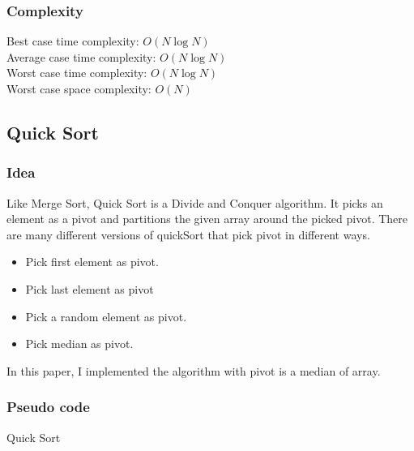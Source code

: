 \documentclass[11pt,a4paper]{article}
\begin{document}
\subsubsection*{Complexity}
Best case time complexity: $O(N \log N)$ \\
Average case time complexity: $O(N\log N)$\\
Worst case time complexity: $O(N \log N)$ \\
Worst case space complexity: $O(N)$

\subsection{Quick Sort}
\subsubsection*{Idea}
Like Merge Sort, Quick Sort is a Divide and Conquer algorithm. 
It picks an element as a pivot and partitions the given array around the picked pivot. 
There are many different versions of quickSort that pick pivot in different ways. 

\begin{itemize}
  \item Pick first element as pivot.
  \item Pick last element as pivot
  \item Pick a random element as pivot.
  \item Pick median as pivot.
\end{itemize}

In this paper, I implemented the algorithm with pivot is a median of array.

\subsubsection*{Pseudo code}
\begin{algorithm2e}
  \SetAlgoLined
  \caption{Quick Sort}
\end{algorithm2e}
\end{document}
